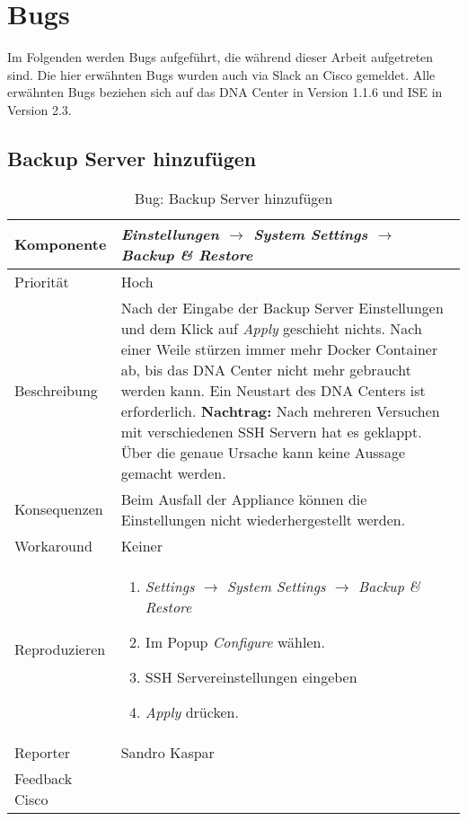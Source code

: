 \section{Bugs}
Im Folgenden werden Bugs aufgeführt, die während dieser Arbeit aufgetreten sind. Die hier erwähnten Bugs wurden auch via Slack an Cisco gemeldet. Alle erwähnten Bugs beziehen sich auf das DNA Center in Version 1.1.6 und ISE in Version 2.3.

\newcommand{\bugreport}[9]{
\subsection{#1}
	\begin{table}[H]
		\rowcolors{2}{gray!25}{white}
		\centering
		\begin{tabularx}{\textwidth}{| l | X |}
			\hline
			Komponente   & #2       \\
			\hline
			Priorität   & #3       \\
			\hline
			Beschreibung   & #4  \\ 
			\hline
			Konsequenzen   & #5  \\ 
			\hline
			Workaround & #6 \\
			\hline
			Reproduzieren & #7	\\
			\hline
			Reporter  & #8 \\
			\hline
			Feedback Cisco & #9 \\
			\hline
		\end{tabularx}
		\caption{Bug: #1}
	\end{table}
}

\bugreport
{Backup Server hinzufügen}
{\textit{Einstellungen $\rightarrow$ System Settings $\rightarrow$ Backup \& Restore}}
{Hoch}
{Nach der Eingabe der Backup Server Einstellungen und dem Klick auf \textit{Apply} geschieht nichts. Nach einer Weile stürzen immer mehr Docker Container ab, bis das DNA Center nicht mehr gebraucht werden kann. Ein Neustart des DNA Centers ist erforderlich.
\textbf{Nachtrag:} Nach mehreren Versuchen mit verschiedenen SSH Servern hat es geklappt. Über die genaue Ursache kann keine Aussage gemacht werden.
}
{Beim Ausfall der Appliance können die Einstellungen nicht wiederhergestellt werden.}
{Keiner}
{
	\begin{enumerate}
		\item \textit{Settings $\rightarrow$ System Settings $\rightarrow$ Backup \& Restore}
		\item Im Popup \textit{Configure} wählen. 
		\item SSH Servereinstellungen eingeben
		\item \textit{Apply} drücken. 
	\end{enumerate}
}
{Sandro Kaspar}
{}

